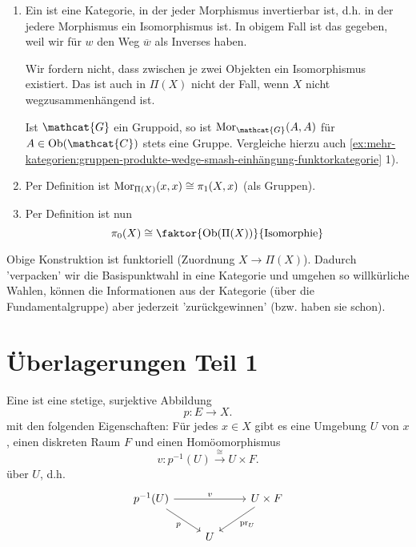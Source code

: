 \begin{remark*}
    \begin{enumerate}[1)]
        \item Ein  ist eine Kategorie, in der jeder Morphismus invertierbar ist, d.h. in der jedere Morphismus ein Isomorphismus ist. In obigem Fall ist das gegeben, weil wir für $w$ den Weg $\overline{w}$ als Inverses haben.
            \begin{warning}
                Wir fordern nicht, dass zwischen je zwei Objekten ein Isomorphismus existiert. Das ist auch in $\Pi(X)$ nicht der Fall, wenn  $X$ nicht wegzusammenhängend ist.
            \end{warning}
            Ist $\mathcat{G}$ ein Gruppoid, so ist $\Mor_{\mathcat{G}}(A,A)$ für $A\in \Ob(\mathcat{C})$ stets eine Gruppe. Vergleiche hierzu auch \autoref{ex:mehr-kategorien:gruppen-produkte-wedge-smash-einhängung-funktorkategorie} 1).
        \item Per Definition ist $\operatorname{Mor}_{\Pi(X)}(x,x) \cong \pi_1(X,x)$ (als Gruppen).
        \item Per Definition ist nun
            \[
                \pi_0(X) \cong \faktor{\Ob(\Pi(X))}{\text{Isomorphie}}
            \] 
    \end{enumerate}
\end{remark*}

\begin{oral}
    Obige Konstruktion ist funktoriell (Zuordnung $X \to  \Pi(X)$). Dadurch 'verpacken' wir die Basispunktwahl in eine Kategorie und umgehen so willkürliche Wahlen, können die Informationen aus der Kategorie (über die Fundamentalgruppe) aber jederzeit 'zurückgewinnen' (bzw. haben sie schon).
\end{oral}


\section{Überlagerungen Teil 1}

\begin{definition}[Überlagerung]\label{def:überlagerung}
    Eine  ist eine stetige, surjektive Abbildung
    \[
    p\colon  E \to  X
    .\] 
    mit den folgenden Eigenschaften:
    Für jedes $x\in X$ gibt es eine Umgebung $U$ von  $x$, einen diskreten Raum  $F$ und einen Homöomorphismus
     \[
         v\colon  p^{-1}(U) \stackrel{\cong}{\longrightarrow} U \times F
    .\] 
    über $U$, d.h.
    \[
\begin{tikzcd}
    p^{-1}(U) \ar{rr}{v} \ar[swap]{dr}{p}& &  U \times F \ar{dl}{\pr_U} \\
                          & U
\end{tikzcd}
\]
\end{definition}

